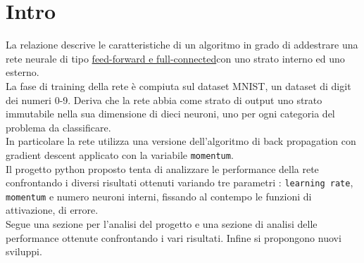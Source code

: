 \chapter{Intro}
La relazione descrive le caratteristiche di un algoritmo in grado di addestrare una rete neurale di tipo \underline{feed-forward e full-connected}\footnotemark con uno strato interno ed uno esterno. \\
La fase di training della rete è compiuta sul dataset MNIST, un dataset di digit dei numeri 0-9. Deriva che la rete abbia come strato di output uno strato immutabile nella sua dimensione di dieci neuroni, uno per ogni categoria del problema da classificare. \\
In particolare la rete utilizza una versione dell'algoritmo di back propagation con gradient descent applicato con la variabile \texttt{momentum}\footnotemark.\\
Il progetto python proposto tenta di analizzare le performance della rete confrontando i diversi risultati ottenuti variando tre parametri : \texttt{learning rate}, \texttt{momentum} e numero neuroni interni, fissando al contempo le funzioni di attivazione, di errore.\\
Segue una sezione per l'analisi del progetto e una sezione di analisi delle performance ottenute confrontando i vari risultati. Infine si propongono nuovi sviluppi.


